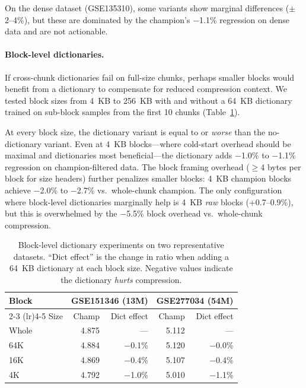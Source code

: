 \documentclass[10pt,twocolumn,letterpaper]{article}
\begin{document}
On the dense dataset (GSE135310), some variants show marginal differences ($\pm$2--4\%), but these are dominated by the champion's $-$1.1\% regression on dense data and are not actionable.

\paragraph{Block-level dictionaries.}
If cross-chunk dictionaries fail on full-size chunks, perhaps smaller blocks would benefit from a dictionary to compensate for reduced compression context.
We tested block sizes from 4~KB to 256~KB with and without a 64~KB dictionary trained on sub-block samples from the first 10 chunks (Table~\ref{tab:block_dict}).

At every block size, the dictionary variant is equal to or \emph{worse} than the no-dictionary variant.
Even at 4~KB blocks---where cold-start overhead should be maximal and dictionaries most beneficial---the dictionary adds $-$1.0\% to $-$1.1\% regression on champion-filtered data.
The block framing overhead ($\geq$4 bytes per block for size headers) further penalizes smaller blocks: 4~KB champion blocks achieve $-$2.0\% to $-$2.7\% vs.\ whole-chunk champion.
The only configuration where block-level dictionaries marginally help is 4~KB \emph{raw} blocks (+0.7--0.9\%), but this is overwhelmed by the $-$5.5\% block overhead vs.\ whole-chunk compression.

\begin{table}[h]
\centering
\caption{Block-level dictionary experiments on two representative datasets. ``Dict effect'' is the change in ratio when adding a 64~KB dictionary at each block size. Negative values indicate the dictionary \emph{hurts} compression.}
\label{tab:block_dict}
\footnotesize
\begin{tabular}{l r r r r}
\toprule
Block & \multicolumn{2}{c}{GSE151346 (13M)} & \multicolumn{2}{c}{GSE277034 (54M)} \\
\cmidrule(lr){2-3} \cmidrule(lr){4-5}
Size & Champ & Dict effect & Champ & Dict effect \\
\midrule
Whole & 4.875 & --- & 5.112 & --- \\
64K  & 4.884 & $-$0.1\% & 5.120 & $-$0.0\% \\
16K  & 4.869 & $-$0.4\% & 5.107 & $-$0.4\% \\
4K   & 4.792 & $-$1.0\% & 5.010 & $-$1.1\% \\
\bottomrule
\end{tabular}
\end{table}
\end{document}
